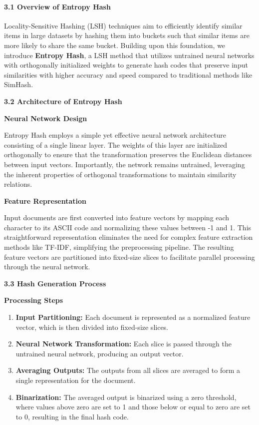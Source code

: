 \documentclass{article}
\begin{document}
\paragraph{\textbf{3.1 Overview of Entropy Hash}}

Locality-Sensitive Hashing (LSH) techniques aim to efficiently identify similar items in large datasets by hashing them into buckets such that similar items are more likely to share the same bucket. Building upon this foundation, we introduce \textbf{Entropy Hash}, a LSH method that utilizes untrained neural networks with orthogonally initialized weights to generate hash codes that preserve input similarities with higher accuracy and speed compared to traditional methods like SimHash.

\textbf{3.2 Architecture of Entropy Hash}

\textbf{Neural Network Design}

Entropy Hash employs a simple yet effective neural network architecture consisting of a single linear layer. The weights of this layer are initialized orthogonally to ensure that the transformation preserves the Euclidean distances between input vectors. Importantly, the network remains untrained, leveraging the inherent properties of orthogonal transformations to maintain similarity relations.

\textbf{Feature Representation}

Input documents are first converted into feature vectors by mapping each character to its ASCII code and normalizing these values between -1 and 1. This straightforward representation eliminates the need for complex feature extraction methods like TF-IDF, simplifying the preprocessing pipeline. The resulting feature vectors are partitioned into fixed-size slices to facilitate parallel processing through the neural network.

\textbf{3.3 Hash Generation Process}

\textbf{Processing Steps}

\begin{enumerate}
    \item \textbf{Input Partitioning:} Each document is represented as a normalized feature vector, which is then divided into fixed-size slices.
    \item \textbf{Neural Network Transformation:} Each slice is passed through the untrained neural network, producing an output vector.
    \item \textbf{Averaging Outputs:} The outputs from all slices are averaged to form a single representation for the document.
    \item \textbf{Binarization:} The averaged output is binarized using a zero threshold, where values above zero are set to 1 and those below or equal to zero are set to 0, resulting in the final hash code.
\end{enumerate}
\end{document}
